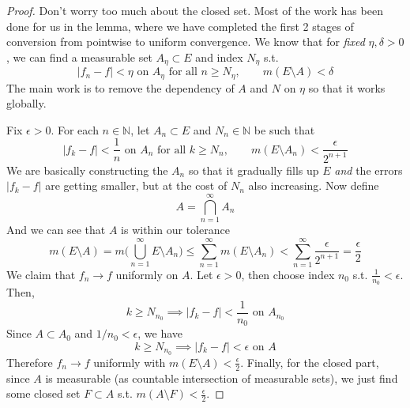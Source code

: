   \begin{proof}
    Don't worry too much about the closed set. Most of the work has been done for us in the lemma, where we have completed the first 2 stages of conversion from pointwise to uniform convergence. We know that for \textit{fixed} $\eta, \delta > 0$, we can find a measurable set $A_\eta \subset E$ and index $N_\eta$ s.t. 
    \begin{equation}
      |f_n - f| < \eta \text{ on } A_\eta \text{ for all } n \geq N_\eta, \qquad m(E \setminus A) < \delta
    \end{equation}
    The main work is to remove the dependency of $A$ and $N$ on $\eta$ so that it works globally. 

    Fix $\epsilon > 0$. For each $n \in \mathbb{N}$, let $A_n \subset E$ and $N_n \in \mathbb{N}$ be such that 
    \begin{equation}
      |f_k - f| < \frac{1}{n} \text{ on } A_n \text{ for all } k \geq N_n, \qquad m(E \setminus A_n) < \frac{\epsilon}{2^{n+1}}
    \end{equation}
    We are basically constructing the $A_n$ so that it gradually fills up $E$ \textit{and} the errors $|f_k - f|$ are getting smaller, but at the cost of $N_n$ also increasing. Now define 
    \begin{equation}
      A = \bigcap_{n=1}^\infty A_n 
    \end{equation}
    And we can see that $A$ is within our tolerance 
    \begin{equation}
      m(E \setminus A) = m \bigg( \bigcup_{n=1}^\infty E \setminus A_n \bigg) \leq \sum_{n=1}^\infty m (E \setminus A_n) < \sum_{n=1}^\infty \frac{\epsilon}{2^{n+1}} = \frac{\epsilon}{2}
    \end{equation}
    We claim that $f_n \to f$ uniformly on $A$. Let $\epsilon > 0$, then choose index $n_0$ s.t. $\frac{1}{n_0} < \epsilon$. Then, 
    \begin{equation}
      k \geq N_{n_0} \implies |f_k - f| < \frac{1}{n_0} \text{ on } A_{n_0} 
    \end{equation}
    Since $A \subset A_0$ and $1/n_0 < \epsilon$, we have 
    \begin{equation}
      k \geq N_{n_0} \implies |f_k - f| < \epsilon \text{ on } A 
    \end{equation}
    Therefore $f_n \to f$ uniformly with $m(E \setminus A) < \frac{\epsilon}{2}$. Finally, for the closed part, since $A$ is measurable (as countable intersection of measurable sets), we just find some closed set $F \subset A$ s.t. $m(A \setminus F) < \frac{\epsilon}{2}$. 
  \end{proof}

